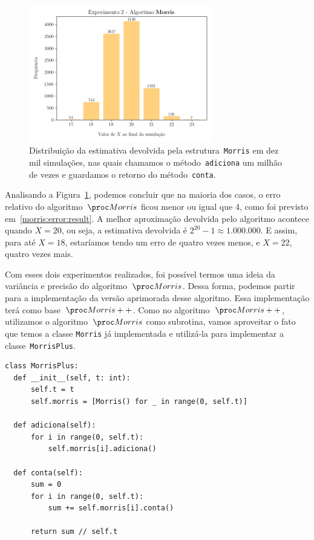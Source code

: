 \begin{figure}[h]
  \centering
  \includegraphics[height=6cm, width=\textwidth]{figuras/morris_variance.png}
	\caption{Distribuição da estimativa devolvida pela estrutura~\texttt{Morris} em dez mil simulações, nas quais
  chamamos o método~\texttt{adiciona} um milhão de vezes e guardamos o retorno do método~\texttt{conta}.}
  \label{fig:morris:variance}
\end{figure}

Analisando a Figura~\ref{fig:morris:variance}, podemos concluir que na maioria dos casos, o erro relativo do 
algoritmo~$\Morris$ ficou menor ou igual que 4, como foi previsto em~\eqref{morris:error:result}. A melhor aproximação 
devolvida pelo algoritmo acontece quando $X = 20$, ou seja, a estimativa devolvida é $2^{20} - 1 \approx 1.000.000$. E 
assim, para até $X = 18$, estaríamos tendo um erro de quatro vezes menos, e $X = 22$, quatro vezes mais.

Com esses dois experimentos realizados, foi possível termos uma ideia da variância e precisão do algoritmo~$\Morris$. 
Dessa forma, podemos partir para a implementação da versão aprimorada desse algoritmo. Essa implementação terá como 
base~$\Morrispp$. Como no algoritmo~$\Morrispp$, utilizamos o algoritmo~$\Morris$ como subrotina, vamos aproveitar o 
fato que temos a classe \texttt{Morris} já implementada e utilizá-la para implementar a classe~\texttt{MorrisPlus}.

\begin{lstlisting}[style=mypython,caption=Implementação do algoritmo $\Morrispp$,captionpos=b, label=morris:plus:code]
class MorrisPlus:
  def __init__(self, t: int):
      self.t = t
      self.morris = [Morris() for _ in range(0, self.t)]

  def adiciona(self):
      for i in range(0, self.t):
          self.morris[i].adiciona()

  def conta(self):
      sum = 0
      for i in range(0, self.t):
          sum += self.morris[i].conta()

      return sum // self.t
\end{lstlisting}

